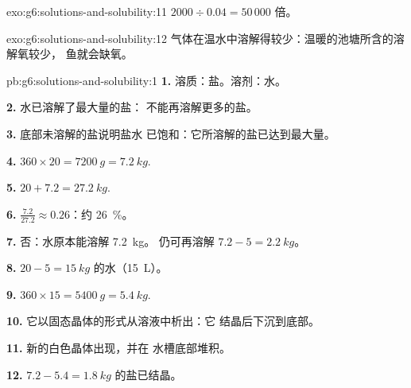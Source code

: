 \begin{solution}{exo:g6:solutions-and-solubility:11}
$2000 \div 0.04 = 50\,000$ 倍。
\end{solution}

\begin{solution}{exo:g6:solutions-and-solubility:12}
气体在温水中溶解得较少：温暖的池塘所含的溶解氧较少，
鱼就会缺氧。
\end{solution}

\begin{solution}{pb:g6:solutions-and-solubility:1}
\textbf{1.} 溶质：盐。溶剂：水。

\textbf{2.} 水已溶解了最大量的盐：
不能再溶解更多的盐。

\textbf{3.} 底部未溶解的盐说明盐水
已饱和：它所溶解的盐已达到最大量。

\textbf{4.} $360 \times 20 = \qty{7200}{g} = \qty{7.2}{kg}$.

\textbf{5.} $20 + 7.2 = \qty{27.2}{kg}$.

\textbf{6.} $\frac{7.2}{27.2} \approx 0.26$：约 \qty{26}{\percent}。

\textbf{7.} 否：水原本能溶解 \qty{7.2}{kg}。
仍可再溶解 $7.2 - 5 = \qty{2.2}{kg}$。

\textbf{8.} $20 - 5 = \qty{15}{kg}$ 的水（\qty{15}{L}）。

\textbf{9.} $360 \times 15 = \qty{5400}{g} = \qty{5.4}{kg}$.

\textbf{10.} 它以固态晶体的形式从溶液中析出：它
结晶后下沉到底部。

\textbf{11.} 新的白色晶体出现，并在
水槽底部堆积。

\textbf{12.} $7.2 - 5.4 = \qty{1.8}{kg}$ 的盐已结晶。
\end{solution}
